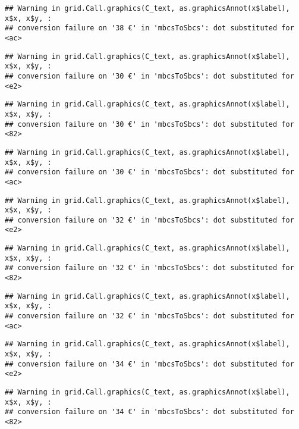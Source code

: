 \documentclass[
]{article}
\begin{document}
\begin{verbatim}
## Warning in grid.Call.graphics(C_text, as.graphicsAnnot(x$label), x$x, x$y, :
## conversion failure on '38 €' in 'mbcsToSbcs': dot substituted for <ac>
\end{verbatim}

\begin{verbatim}
## Warning in grid.Call.graphics(C_text, as.graphicsAnnot(x$label), x$x, x$y, :
## conversion failure on '30 €' in 'mbcsToSbcs': dot substituted for <e2>
\end{verbatim}

\begin{verbatim}
## Warning in grid.Call.graphics(C_text, as.graphicsAnnot(x$label), x$x, x$y, :
## conversion failure on '30 €' in 'mbcsToSbcs': dot substituted for <82>
\end{verbatim}

\begin{verbatim}
## Warning in grid.Call.graphics(C_text, as.graphicsAnnot(x$label), x$x, x$y, :
## conversion failure on '30 €' in 'mbcsToSbcs': dot substituted for <ac>
\end{verbatim}

\begin{verbatim}
## Warning in grid.Call.graphics(C_text, as.graphicsAnnot(x$label), x$x, x$y, :
## conversion failure on '32 €' in 'mbcsToSbcs': dot substituted for <e2>
\end{verbatim}

\begin{verbatim}
## Warning in grid.Call.graphics(C_text, as.graphicsAnnot(x$label), x$x, x$y, :
## conversion failure on '32 €' in 'mbcsToSbcs': dot substituted for <82>
\end{verbatim}

\begin{verbatim}
## Warning in grid.Call.graphics(C_text, as.graphicsAnnot(x$label), x$x, x$y, :
## conversion failure on '32 €' in 'mbcsToSbcs': dot substituted for <ac>
\end{verbatim}

\begin{verbatim}
## Warning in grid.Call.graphics(C_text, as.graphicsAnnot(x$label), x$x, x$y, :
## conversion failure on '34 €' in 'mbcsToSbcs': dot substituted for <e2>
\end{verbatim}

\begin{verbatim}
## Warning in grid.Call.graphics(C_text, as.graphicsAnnot(x$label), x$x, x$y, :
## conversion failure on '34 €' in 'mbcsToSbcs': dot substituted for <82>
\end{verbatim}
\end{document}
